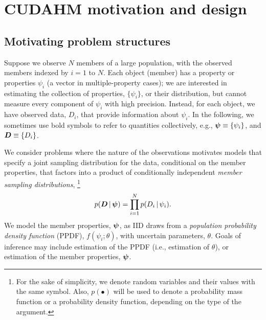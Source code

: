 \section{CUDAHM motivation and design}
\label{sec:design}

\subsection{Motivating problem structures}
\label{sec:motiv}

Suppose we observe $N$ members of a large population, with the observed members indexed by $i=1$ to $N$.
Each object (member) has a property or properties $\psi_i$ (a vector in multiple-property cases); we are interested in estimating the collection of properties, $\{\psi_i\}$, or their distribution, but cannot measure every component of $\psi_i$ with high precision.
Instead, for each object, we have observed data, $D_i$, that provide information about $\psi_i$.
In the following, we sometimes use bold symbols to refer to quantities collectively, e.g., $\boldsymbol{\psi} \equiv \{\psi_i\}$, and $\boldsymbol{D} \equiv \{D_i\}$.

We consider problems where the nature of the observations motivates models that specify a joint sampling distribution for the data, conditional on the member properties, that factors into a product of conditionally independent \emph{member sampling distributions},%
\footnote{For the sake of simplicity, we denote random variables and their values with the same symbol.
Also, $p(\bullet)$ will be used to denote a probability mass function or a probability density function, depending on the type of the argument.}
\begin{equation}
p(\boldsymbol{D} \,|\, \boldsymbol{\psi}) = \prod_{i=1}^N p(D_i \,|\, \psi_i).
\label{data-joint-member}
\end{equation}
We model the member properties, $\boldsymbol{\psi}$, as IID draws from a \emph{population probability density function} (PPDF), $f(\psi_i;\theta)$, with uncertain parameters, $\theta$.
Goals of inference may include estimation of the PPDF (i.e., estimation of $\theta$), or estimation of the member properties, $\boldsymbol{\psi}$.

